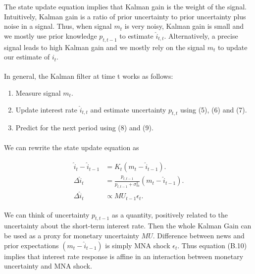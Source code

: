 \documentclass[12pt]{article}
\begin{document}
The state update equation implies that Kalman gain is the weight of the signal. Intuitively, Kalman gain is a ratio of prior uncertainty to prior uncertainty plus noise in a signal. Thus, when signal $m_t$ is very noisy, Kalman gain is small and we mostly use prior knowledge $p_{t,t-1}$ to estimate $\hat{i}_{t,t}$. Alternatively, a precise signal leads to high Kalman gain and we mostly rely on the signal $m_t$ to update our estimate of $i_t$. 
\paragraph{}
In general, the Kalman filter at time t works as follows:
\begin{enumerate}
    \item {Measure signal $m_t$.}
    \item {Update interest rate $\hat{i}_{t,t}$ and estimate uncertainty $p_{t,t}$ using (5), (6) and (7).}
    \item {Predict for the next period using (8) and (9).}
\end{enumerate}
\paragraph{}
We can rewrite the state update equation as

\begin{align}
\begin{split}
\hat{i}_t - \hat{i}_{t-1} & = K_t (m_t - \hat{i}_{t-1}). \\
\Delta \hat{i}_t & = \frac{p_{t,t-1}}{p_{t,t-1}+\sigma^2_{m}} (m_t - \hat{i}_{t-1}). \\
\Delta \hat{i}_t & \propto MU_{t-1} \epsilon_t.
\end{split}
\end{align}

We can think of uncertainty ${p_{t,t-1}}$ as a quantity, positively related to the uncertainty about the short-term interest rate. Then the whole Kalman Gain can be used as a proxy for monetary uncertainty $MU$. Difference between news and prior expectations $(m_t - \hat{i}_{t-1})$ is simply MNA shock $\epsilon_t$. Thus equation (B.10) implies that interest rate response is affine in an interaction between monetary uncertainty and MNA shock.
\end{document}
